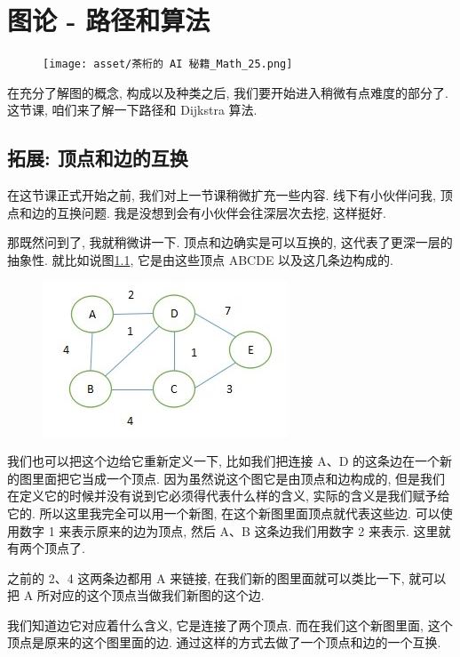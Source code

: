 \chapter{图论 - 路径和算法}

\begin{figure}[ht]
  \centering
  \texttt{[image: asset/茶桁的 AI 秘籍\_Math\_25.png]}
\end{figure}

\newpage

在充分了解图的概念, 构成以及种类之后, 我们要开始进入稍微有点难度的部分了. 这节课, 咱们来了解一下路径和 Dijkstra 算法. 

\section{拓展: 顶点和边的互换}

在这节课正式开始之前, 我们对上一节课稍微扩充一些内容. 线下有小伙伴问我, 顶点和边的互换问题. 我是没想到会有小伙伴会往深层次去挖, 这样挺好. 

那既然问到了, 我就稍微讲一下. 顶点和边确实是可以互换的, 这代表了更深一层的抽象性. 就比如说图\ref{fig:img26_1}, 它是由这些顶点 ABCDE 以及这几条边构成的. 

\begin{figure}[ht]
  \centering
  \includegraphics[width=0.5\linewidth]{asset/20230924051221.jpg}
  \caption{}
  \label{fig:img26_1}
\end{figure}

我们也可以把这个边给它重新定义一下, 比如我们把连接 A、D 的这条边在一个新的图里面把它当成一个顶点. 因为虽然说这个图它是由顶点和边构成的, 但是我们在定义它的时候并没有说到它必须得代表什么样的含义, 实际的含义是我们赋予给它的. 所以这里我完全可以用一个新图, 在这个新图里面顶点就代表这些边. 
可以使用数字 1 来表示原来的边为顶点, 然后 A、B 这条边我们用数字 2 来表示. 这里就有两个顶点了. 

之前的 2、4 这两条边都用 A 来链接, 在我们新的图里面就可以类比一下, 就可以把 A 所对应的这个顶点当做我们新图的这个边. 

我们知道边它对应着什么含义, 它是连接了两个顶点. 而在我们这个新图里面, 这个顶点是原来的这个图里面的边. 通过这样的方式去做了一个顶点和边的一个互换. 

